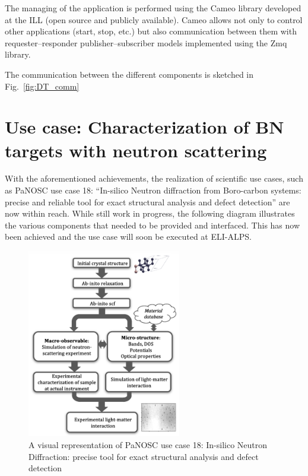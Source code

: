 \documentclass[11pt, a4paper]{article}
\begin{document}
The managing of the application is performed using the Cameo library developed at the ILL (open source and publicly available). Cameo allows not only to control other applications (start, stop, etc.) but also communication between them with requester--responder publisher--subscriber models implemented using the Zmq library.

The communication between the different components is sketched in Fig.~\ref{fig:DT_comm}


\section{Use case: Characterization of BN targets with neutron scattering}
With the aforementioned achievements, the realization of scientific use cases, such as PaNOSC use case 18: ``In-silico Neutron diffraction from Boro-carbon systems:
precise and reliable tool for exact structural analysis and defect detection''
are now within reach. While still work in progress, the following diagram illustrates the
various components that needed to be provided and interfaced. This has now been
achieved and the use case will soon be executed at ELI-ALPS.
  \begin{figure}
    \centering
    \includegraphics[width=0.6\textwidth]{figures/usecase_mono.png}
    \caption{A visual representation of PaNOSC use case 18: In-silico Neutron Diffraction: precise tool for exact structural analysis and defect detection}
    \label{fig:UseCase18}
  \end{figure}
\end{document}
